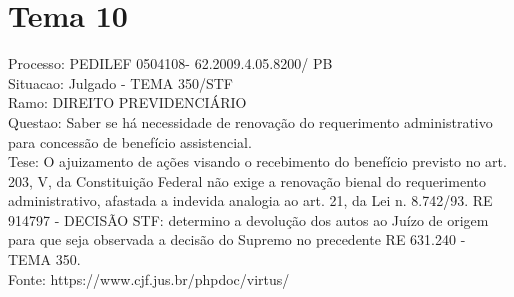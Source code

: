 \documentclass[12pt]{article}
\begin{document}
\section*{Tema 10}
Processo: PEDILEF 0504108- 62.2009.4.05.8200/ PB\\
Situacao: Julgado - TEMA 350/STF\\
Ramo: DIREITO PREVIDENCIÁRIO\\
Questao: Saber se há necessidade de renovação do requerimento administrativo para concessão de benefício assistencial.\\
Tese: O ajuizamento de ações visando o recebimento do benefício previsto no art. 203, V, da Constituição Federal não exige a renovação bienal do requerimento administrativo, afastada a indevida analogia ao art. 21, da Lei n. 8.742/93. RE 914797 - DECISÃO STF: determino a devolução dos autos ao Juízo de origem para que seja observada a decisão do Supremo no precedente RE 631.240 - TEMA 350.\\
Fonte: https://www.cjf.jus.br/phpdoc/virtus/
\end{document}
